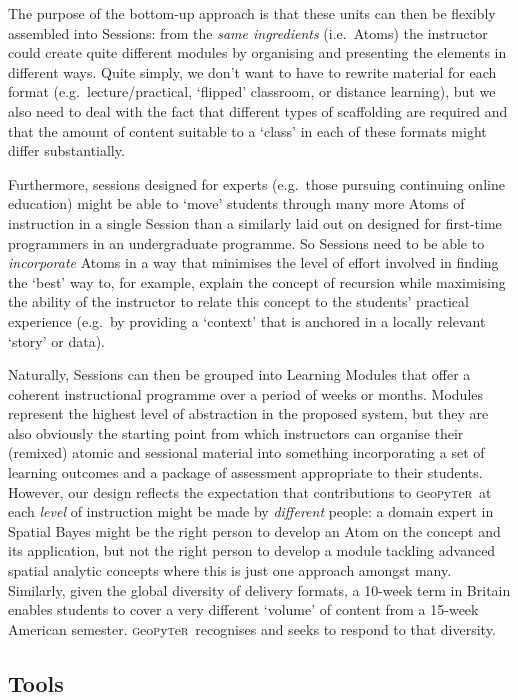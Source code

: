 \documentclass[letter, 11pt,titlepage]{article}
\newcommand{\gp}{\textsc{g}eo\textsc{p}y\textsc{t}e\textsc{r}~\/}
\newcommand{\eg}{e.g.~\/}
\newcommand{\ie}{i.e.~\/}
\begin{document}
The purpose of the bottom-up approach is that these units can then be flexibly assembled into Sessions: from the \emph{same ingredients} (\ie Atoms) the instructor could create quite different modules by organising and presenting the elements in different ways. Quite simply, we don't want to have to rewrite material for each format (\eg lecture/practical, `flipped' classroom, or distance learning), but we also need to deal with the fact that different types of scaffolding are required and that the amount of content suitable to a `class' in each of these formats might differ substantially. 

Furthermore, sessions designed for experts (\eg those pursuing continuing online education) might be able to `move' students through many more Atoms of instruction in a single Session than a similarly laid out on designed for first-time programmers in an undergraduate programme. So Sessions need to be able to \emph{incorporate} Atoms in a way that minimises the level of effort involved in finding the `best' way to, for example, explain the concept of recursion while maximising the ability of the instructor to relate this concept to the students' practical experience (\eg by providing a `context' that is anchored in a locally relevant `story' or data).

Naturally, Sessions can then be grouped into Learning Modules that offer a coherent instructional programme over a period of weeks or months. Modules represent the highest level of abstraction in the proposed system, but they are also obviously the starting point from which instructors can organise their (remixed) atomic and sessional material into something incorporating a set of learning outcomes and a package of assessment appropriate to their students. However, our design reflects the expectation that contributions to \gp at each \emph{level} of instruction might be made by \emph{different} people: a domain expert in Spatial Bayes might be the right person to develop an Atom on the concept and its application, but not the right person to develop a module tackling advanced spatial analytic concepts where this is just one approach amongst many. Similarly, given the global diversity of delivery formats, a 10-week term in Britain enables students to cover a very different `volume' of content from a 15-week American semester. \gp recognises and seeks to respond to that diversity.

\subsection{Tools}\label{tools}
\end{document}
